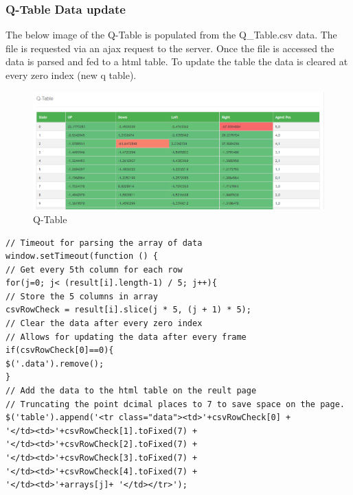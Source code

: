 \subsubsection{Q-Table Data update}
The below image of the Q-Table is populated from the Q\_Table.csv data. The file is requested via an ajax request to the server. Once the file is accessed the data is parsed and fed to a html table. 
To update the table the data is cleared at every zero index (new q table).

\begin{figure}[H]
	\centering
	\includegraphics[width=0.7\linewidth]{img/qtable}
	\caption{Q-Table}
	\label{fig:qtable}
\end{figure}
\begin{verbatim}
// Timeout for parsing the array of data
window.setTimeout(function () {
// Get every 5th column for each row
for(j=0; j< (result[i].length-1) / 5; j++){
// Store the 5 columns in array
csvRowCheck = result[i].slice(j * 5, (j + 1) * 5);
// Clear the data after every zero index
// Allows for updating the data after every frame
if(csvRowCheck[0]==0){
$('.data').remove();
}
// Add the data to the html table on the reult page
// Truncating the point dcimal places to 7 to save space on the page.
$('table').append('<tr class="data"><td>'+csvRowCheck[0] + 
'</td><td>'+csvRowCheck[1].toFixed(7) + 
'</td><td>'+csvRowCheck[2].toFixed(7) + 
'</td><td>'+csvRowCheck[3].toFixed(7) +
'</td><td>'+csvRowCheck[4].toFixed(7) + 
'</td><td>'+arrays[j]+ '</td></tr>');
\end{verbatim}
